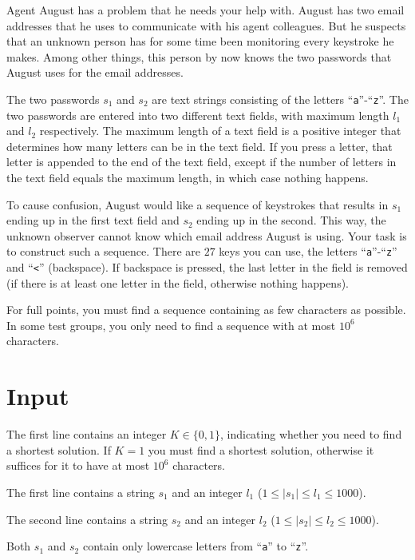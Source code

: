 
Agent August has a problem that he needs your help with. August has two email addresses that he uses
to communicate with his agent colleagues. But he suspects that an unknown person has for some time been
monitoring every keystroke he makes. Among other things, this person by now knows the two passwords
that August uses for the email addresses.

The two passwords $s_1$ and $s_2$ are text strings consisting of the letters ``\texttt{a}''-``\texttt{z}''. The two passwords are entered
into two different text fields, with maximum length $l_1$ and $l_2$ respectively. The maximum length of a text field is a positive integer
that determines how many letters can be in the text field. If you press a letter, that letter is appended to the end
of the text field, except if the number of letters in the text field equals the maximum length, in which case nothing happens.

To cause confusion, August would like a sequence of keystrokes that results in $s_1$ ending up
in the first text field and $s_2$ ending up in the second. This way, the unknown observer cannot know which
email address August is using. Your task is to construct such a sequence. There are $27$ keys you can use,
the letters ``\texttt{a}''-``\texttt{z}'' and ``\texttt{<}'' (backspace). If backspace is pressed, the last letter in the field
is removed (if there is at least one letter in the field, otherwise nothing happens).

For full points, you must find a sequence containing as few characters as possible. In some test groups, you only
need to find a sequence with at most $10^6$ characters.


\section*{Input}
The first line contains an integer $K \in \{0, 1\}$, indicating whether you need to find a shortest solution.
If $K = 1$ you must find a shortest solution, otherwise it suffices for it to have at most $10^6$ characters.

The first line contains a string $s_1$ and an integer $l_1$ ($1 \leq |s_1| \leq l_1 \leq 1000$).

The second line contains a string $s_2$ and an integer $l_2$ ($1 \leq |s_2| \leq l_2 \leq 1000$).

Both $s_1$ and $s_2$ contain only lowercase letters from ``\texttt{a}'' to ``\texttt{z}''.

